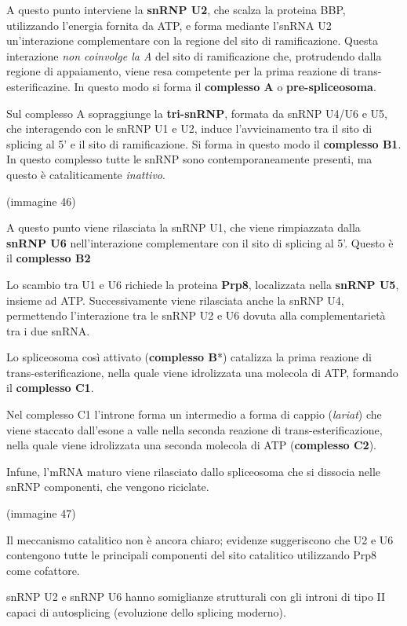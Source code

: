 \documentclass[]{article}
\begin{document}
A questo punto interviene la \textbf{snRNP U2}, che scalza la proteina
BBP, utilizzando l'energia fornita da ATP, e forma mediante l'snRNA U2
un'interazione complementare con la regione del sito di ramificazione.
Questa interazione \emph{non coinvolge la A} del sito di ramificazione
che, protrudendo dalla regione di appaiamento, viene resa competente per
la prima reazione di trans-esterificazine. In questo modo si forma il
\textbf{complesso A} o \textbf{pre-spliceosoma}.

Sul complesso A sopraggiunge la \textbf{tri-snRNP}, formata da snRNP
U4/U6 e U5, che interagendo con le snRNP U1 e U2, induce l'avvicinamento
tra il sito di splicing al 5' e il sito di ramificazione. Si forma in
questo modo il \textbf{complesso B1}. In questo complesso tutte le snRNP
sono contemporaneamente presenti, ma questo è cataliticamente
\emph{inattivo}.

(immagine 46)

A questo punto viene rilasciata la snRNP U1, che viene rimpiazzata dalla
\textbf{snRNP U6} nell'interazione complementare con il sito di splicing
al 5'. Questo è il \textbf{complesso B2}

Lo scambio tra U1 e U6 richiede la proteina \textbf{Prp8}, localizzata
nella \textbf{snRNP U5}, insieme ad ATP. Successivamente viene
rilasciata anche la snRNP U4, permettendo l'interazione tra le snRNP U2
e U6 dovuta alla complementarietà tra i due snRNA.

Lo spliceosoma così attivato (\textbf{complesso B}*) catalizza la prima
reazione di trans-esterificazione, nella quale viene idrolizzata una
molecola di ATP, formando il \textbf{complesso C1}.

Nel complesso C1 l'introne forma un intermedio a forma di cappio
(\emph{lariat}) che viene staccato dall'esone a valle nella seconda
reazione di trans-esterificazione, nella quale viene idrolizzata una
seconda molecola di ATP (\textbf{complesso C2}).

Infune, l'mRNA maturo viene rilasciato dallo spliceosoma che si dissocia
nelle snRNP componenti, che vengono riciclate.

(immagine 47)

Il meccanismo catalitico non è ancora chiaro; evidenze suggeriscono che
U2 e U6 contengono tutte le principali componenti del sito catalitico
utilizzando Prp8 come cofattore.

snRNP U2 e snRNP U6 hanno somiglianze strutturali con gli introni di
tipo II capaci di autosplicing (evoluzione dello splicing moderno).
\end{document}
